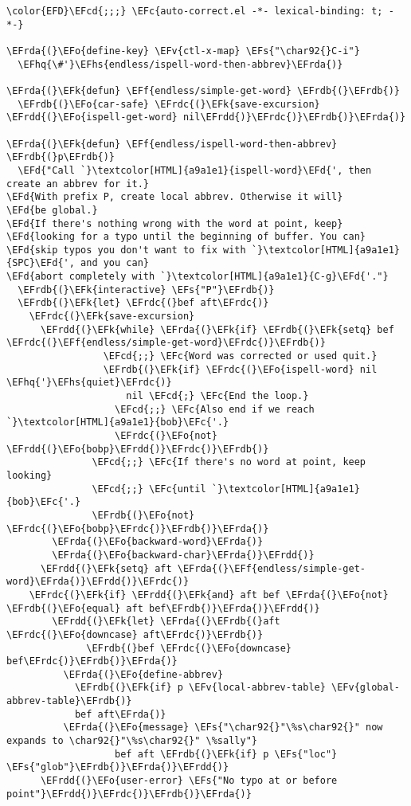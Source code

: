 \documentclass[a4wide,10pt]{article}
\newcommand{\EFc}[1]{\textcolor{EFc}{#1}} %
\newcommand{\EFcd}[1]{\textcolor{EFcd}{#1}} %
\newcommand{\EFs}[1]{\textcolor{EFs}{#1}} %
\newcommand{\EFd}[1]{\textcolor{EFd}{#1}} %
\newcommand{\EFk}[1]{\textcolor{EFk}{#1}} %
\newcommand{\EFf}[1]{\textcolor{EFf}{#1}} %
\newcommand{\EFv}[1]{\textcolor{EFv}{#1}} %
\newcommand{\EFo}[1]{\textcolor{EFo}{#1}} %
\newcommand{\EFhq}[1]{\textcolor{EFhq}{#1}} %
\newcommand{\EFhs}[1]{\textcolor{EFhs}{#1}} %
\newcommand{\EFrda}[1]{\textcolor{EFrda}{#1}} %
\newcommand{\EFrdb}[1]{\textcolor{EFrdb}{#1}} %
\newcommand{\EFrdc}[1]{\textcolor{EFrdc}{#1}} %
\newcommand{\EFrdd}[1]{\textcolor{EFrdd}{#1}} %
\begin{document}
\begin{Code}
\begin{Verbatim}
\color{EFD}\EFcd{;;;} \EFc{auto-correct.el -*- lexical-binding: t; -*-}

\EFrda{(}\EFo{define-key} \EFv{ctl-x-map} \EFs{"\char92{}C-i"}
  \EFhq{\#'}\EFhs{endless/ispell-word-then-abbrev}\EFrda{)}

\EFrda{(}\EFk{defun} \EFf{endless/simple-get-word} \EFrdb{(}\EFrdb{)}
  \EFrdb{(}\EFo{car-safe} \EFrdc{(}\EFk{save-excursion} \EFrdd{(}\EFo{ispell-get-word} nil\EFrdd{)}\EFrdc{)}\EFrdb{)}\EFrda{)}

\EFrda{(}\EFk{defun} \EFf{endless/ispell-word-then-abbrev} \EFrdb{(}p\EFrdb{)}
  \EFd{"Call `}\textcolor[HTML]{a9a1e1}{ispell-word}\EFd{', then create an abbrev for it.}
\EFd{With prefix P, create local abbrev. Otherwise it will}
\EFd{be global.}
\EFd{If there's nothing wrong with the word at point, keep}
\EFd{looking for a typo until the beginning of buffer. You can}
\EFd{skip typos you don't want to fix with `}\textcolor[HTML]{a9a1e1}{SPC}\EFd{', and you can}
\EFd{abort completely with `}\textcolor[HTML]{a9a1e1}{C-g}\EFd{'."}
  \EFrdb{(}\EFk{interactive} \EFs{"P"}\EFrdb{)}
  \EFrdb{(}\EFk{let} \EFrdc{(}bef aft\EFrdc{)}
    \EFrdc{(}\EFk{save-excursion}
      \EFrdd{(}\EFk{while} \EFrda{(}\EFk{if} \EFrdb{(}\EFk{setq} bef \EFrdc{(}\EFf{endless/simple-get-word}\EFrdc{)}\EFrdb{)}
                 \EFcd{;;} \EFc{Word was corrected or used quit.}
                 \EFrdb{(}\EFk{if} \EFrdc{(}\EFo{ispell-word} nil \EFhq{'}\EFhs{quiet}\EFrdc{)}
                     nil \EFcd{;} \EFc{End the loop.}
                   \EFcd{;;} \EFc{Also end if we reach `}\textcolor[HTML]{a9a1e1}{bob}\EFc{'.}
                   \EFrdc{(}\EFo{not} \EFrdd{(}\EFo{bobp}\EFrdd{)}\EFrdc{)}\EFrdb{)}
               \EFcd{;;} \EFc{If there's no word at point, keep looking}
               \EFcd{;;} \EFc{until `}\textcolor[HTML]{a9a1e1}{bob}\EFc{'.}
               \EFrdb{(}\EFo{not} \EFrdc{(}\EFo{bobp}\EFrdc{)}\EFrdb{)}\EFrda{)}
        \EFrda{(}\EFo{backward-word}\EFrda{)}
        \EFrda{(}\EFo{backward-char}\EFrda{)}\EFrdd{)}
      \EFrdd{(}\EFk{setq} aft \EFrda{(}\EFf{endless/simple-get-word}\EFrda{)}\EFrdd{)}\EFrdc{)}
    \EFrdc{(}\EFk{if} \EFrdd{(}\EFk{and} aft bef \EFrda{(}\EFo{not} \EFrdb{(}\EFo{equal} aft bef\EFrdb{)}\EFrda{)}\EFrdd{)}
        \EFrdd{(}\EFk{let} \EFrda{(}\EFrdb{(}aft \EFrdc{(}\EFo{downcase} aft\EFrdc{)}\EFrdb{)}
              \EFrdb{(}bef \EFrdc{(}\EFo{downcase} bef\EFrdc{)}\EFrdb{)}\EFrda{)}
          \EFrda{(}\EFo{define-abbrev}
            \EFrdb{(}\EFk{if} p \EFv{local-abbrev-table} \EFv{global-abbrev-table}\EFrdb{)}
            bef aft\EFrda{)}
          \EFrda{(}\EFo{message} \EFs{"\char92{}"\%s\char92{}" now expands to \char92{}"\%s\char92{}" \%sally"}
                   bef aft \EFrdb{(}\EFk{if} p \EFs{"loc"} \EFs{"glob"}\EFrdb{)}\EFrda{)}\EFrdd{)}
      \EFrdd{(}\EFo{user-error} \EFs{"No typo at or before point"}\EFrdd{)}\EFrdc{)}\EFrdb{)}\EFrda{)}


\end{Verbatim}
\end{Code}
\end{document}
